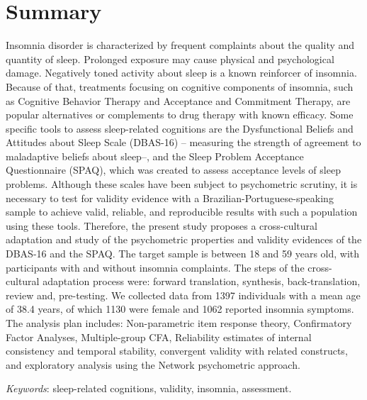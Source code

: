 \documentclass[
  ,doc,11pt, twoside,floatsintext]{apa6}
\begin{document}
\newpage

\begin{flushleft}
{
\tableofcontents
}
\end{flushleft}

\newpage

\thispagestyle{empty}

\hypertarget{summary}{%
\section{Summary}\label{summary}}

Insomnia disorder is characterized by frequent complaints about the quality and quantity of sleep. Prolonged exposure may cause physical and psychological damage. Negatively toned activity about sleep is a known reinforcer of insomnia. Because of that, treatments focusing on cognitive components of insomnia, such as Cognitive Behavior Therapy and Acceptance and Commitment Therapy, are popular alternatives or complements to drug therapy with known efficacy. Some specific tools to assess sleep-related cognitions are the Dysfunctional Beliefs and Attitudes about Sleep Scale (DBAS-16) -- measuring the strength of agreement to maladaptive beliefs about sleep--, and the Sleep Problem Acceptance Questionnaire (SPAQ), which was created to assess acceptance levels of sleep problems. Although these scales have been subject to psychometric scrutiny, it is necessary to test for validity evidence with a Brazilian-Portuguese-speaking sample to achieve valid, reliable, and reproducible results with such a population using these tools. Therefore, the present study proposes a cross-cultural adaptation and study of the psychometric properties and validity evidences of the DBAS-16 and the SPAQ. The target sample is between 18 and 59 years old, with participants with and without insomnia complaints. The steps of the cross-cultural adaptation process were: forward translation, synthesis, back-translation, review and, pre-testing. We collected data from 1397 individuals with a mean age of 38.4 years, of which 1130 were female and 1062 reported insomnia symptoms. The analysis plan includes: Non-parametric item response theory, Confirmatory Factor Analyses, Multiple-group CFA, Reliability estimates of internal consistency and temporal stability, convergent validity with related constructs, and exploratory analysis using the Network psychometric approach.

\begin{flushleft}
\emph{Keywords}: sleep-related cognitions, validity, insomnia, assessment.
\end{flushleft}
\end{document}
